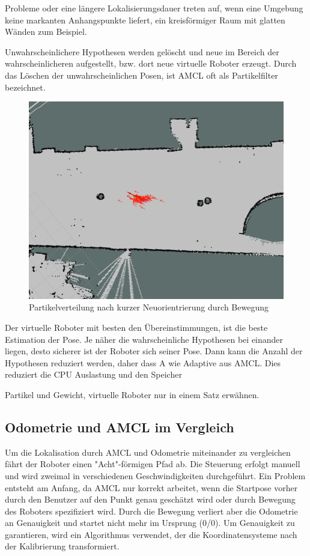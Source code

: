 \documentclass[11pt,a4paper]{article}
\begin{document}
{Probleme oder eine l\"angere Lokalisierungsdauer treten auf, wenn eine Umgebung keine markanten Anhangspunkte liefert, ein kreisf\"ormiger Raum mit glatten W\"anden zum Beispiel.

Unwahrscheinlichere Hypothesen werden gel\"oscht und neue im Bereich der wahrscheinlicheren aufgestellt, bzw. dort neue virtuelle Roboter erzeugt. Durch das L\"oschen der unwahrscheinlichen Posen, ist AMCL oft als Partikelfilter bezeichnet.





\begin{figure}[h]
	\includegraphics[width=\linewidth]{pictures/drive_little.jpg}
	\caption{Partikelverteilung nach kurzer Neuorientrierung durch Bewegung}
\end{figure}
 
Der virtuelle Roboter  mit besten den \"Ubereinstimmungen, ist die beste Estimation der Pose.
Je n\"aher die wahrscheinliche Hypothesen bei einander liegen, desto sicherer ist der Roboter sich seiner Pose. Dann kann die Anzahl der Hypothesen reduziert werden, daher dass A wie Adaptive aus AMCL. Dies reduziert die CPU Auslastung und den Speicher

Partikel und Gewicht, virtuelle Roboter nur in einem Satz erwähnen.

 


\subsection{Odometrie und AMCL im Vergleich}
Um die Lokalisation durch AMCL und Odometrie miteinander zu vergleichen f\"ahrt der Roboter einen "Acht"-f\"ormigen Pfad ab. Die Steuerung erfolgt manuell und wird zweimal in verschiedenen Geschwindigkeiten durchgef\"uhrt. Ein Problem entsteht am Anfang, da AMCL nur korrekt arbeitet, wenn die Startpose vorher durch den Benutzer auf den Punkt genau gesch\"atzt wird oder durch Bewegung des Roboters spezifiziert wird. Durch die Bewegung verliert aber die Odometrie an Genauigkeit und startet nicht mehr im Ursprung (0/0). Um Genauigkeit zu garantieren, wird ein Algorithmus verwendet, der die Koordinatensysteme nach der Kalibrierung transformiert.

}
\end{document}
